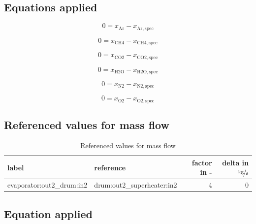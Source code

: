 \subsection{Equations applied}

\begin{equation}
\label{eq:Connection_Ar}
0 = x_\mathrm{Ar} - x_\mathrm{Ar,spec}
\end{equation}

\begin{equation}
\label{eq:Connection_CH4}
0 = x_\mathrm{CH4} - x_\mathrm{CH4,spec}
\end{equation}

\begin{equation}
\label{eq:Connection_CO2}
0 = x_\mathrm{CO2} - x_\mathrm{CO2,spec}
\end{equation}

\begin{equation}
\label{eq:Connection_H2O}
0 = x_\mathrm{H2O} - x_\mathrm{H2O,spec}
\end{equation}

\begin{equation}
\label{eq:Connection_N2}
0 = x_\mathrm{N2} - x_\mathrm{N2,spec}
\end{equation}

\begin{equation}
\label{eq:Connection_O2}
0 = x_\mathrm{O2} - x_\mathrm{O2,spec}
\end{equation}

\subsection{Referenced values for mass flow}

\begin{table}[H]\begin{center}
\begin{tabular}{llrr}
\toprule
                     label &                   reference &  factor in - &  delta in $\unitfrac[]{kg}{s}$ \\
\midrule
 evaporator:out2\_drum:in2 &  drum:out2\_superheater:in2 &            4 &                              0 \\
\bottomrule
\end{tabular}
\caption{Referenced values for mass flow}
\end{center}\end{table}

\subsection{Equation applied}


